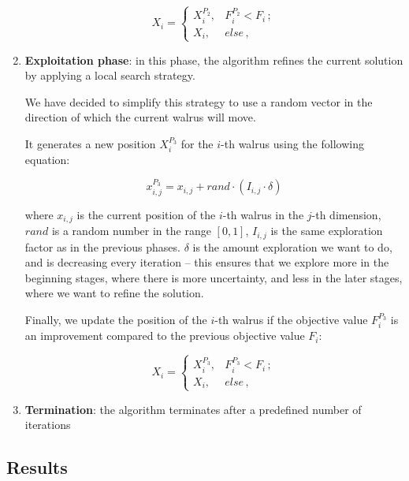 \documentclass{article}
\begin{document}
\begin{enumerate}
    \[
      {X}_{i}=
      \begin{cases}
        {X}_{i}^{{P}_{2}}, & {F}_{i}^{{P}_{2}}<{F}_{i}\,;\\

        {X}_{i}, & else\,,
      \end{cases}
    \]

  \item \textbf{Exploitation phase}: in this phase, the algorithm
    refines the current solution by applying a local search strategy.

    We have decided to simplify this strategy to use a random vector
    in the direction of which the current walrus will move.

    It generates a new position ${X}_{i}^{{P}_{3}}$ for the $i$-th walrus
    using the following equation:

    \[
      x_{i,j}^{P_3}=x_{i,j} + rand \cdot \left( I_{i,j} \cdot \delta \right)
    \]

    where $x_{i,j}$ is the current position of the $i$-th walrus in
    the $j$-th dimension, $rand$ is a random number in the range
    $[0, 1]$, $I_{i,j}$ is the same exploration factor as in the previous
    phases. $\delta$ is the amount exploration we want to do, and is
    decreasing every iteration -- this ensures that we explore more in the
    beginning stages, where there is more uncertainty, and less in the
    later stages, where we want to refine the solution.

    Finally, we update the position of the $i$-th walrus if the
    objective value $F_i^{P_3}$ is an improvement compared to the
    previous objective value $F_i$:

    \[
      {X}_{i}=
      \begin{cases}
        {X}_{i}^{{P}_{3}}, & {F}_{i}^{{P}_{3}}<{F}_{i}\,;\\

        {X}_{i}, & else\,,
      \end{cases}
    \]

  \item \textbf{Termination}: the algorithm terminates after a
    predefined number of iterations

\end{enumerate}

\subsection{Results}
\end{document}
